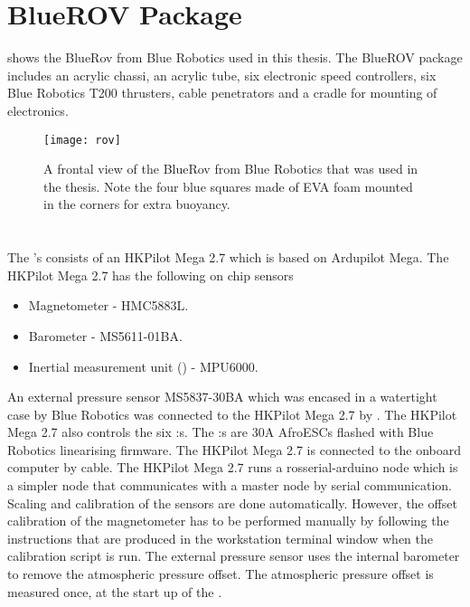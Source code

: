 \section{BlueROV Package}
 shows the BlueRov from Blue Robotics used in this thesis. The BlueROV package includes an acrylic chassi, an acrylic tube, six electronic speed controllers, six Blue Robotics T200 thrusters, cable penetrators and a cradle for mounting of electronics.
\begin{figure}
\centering
\texttt{[image: rov]}
\caption{A frontal view of the BlueRov from Blue Robotics that was used in the thesis.
Note the four blue squares made of EVA foam mounted in the corners for extra buoyancy.}
\label{fig:rov}
\end{figure}

\section{\abbrROV \abbrIO}
The \abbrROV's \abbrIO consists of an HKPilot Mega 2.7 which is based on Ardupilot Mega. The HKPilot Mega 2.7 has the following on chip sensors
\begin{itemize}
    \item Magnetometer - HMC5883L.
    \item Barometer - MS5611-01BA.
    \item Inertial measurement unit (\abbrIMU) - MPU6000.
\end{itemize}
An external pressure sensor MS5837-30BA which was encased in a watertight case by Blue Robotics was connected to the HKPilot Mega 2.7 by \abbrIC.
The HKPilot Mega 2.7 also controls the six \abbrESC:s. The \abbrESC:s are 30A AfroESCs flashed with Blue Robotics linearising firmware. The HKPilot Mega 2.7 is connected to the onboard computer by \abbrUSB cable. The HKPilot Mega 2.7 runs a rosserial-arduino node which is a simpler \abbrROS node that communicates with a master node by serial communication. Scaling and calibration of the sensors are done automatically. However, the offset calibration of the magnetometer has to be performed manually by following the instructions that are produced in the workstation terminal window when the calibration script is run. The external pressure sensor uses the internal barometer to remove the atmospheric pressure offset. The atmospheric pressure offset is measured once, at the start up of the \abbrROV.

